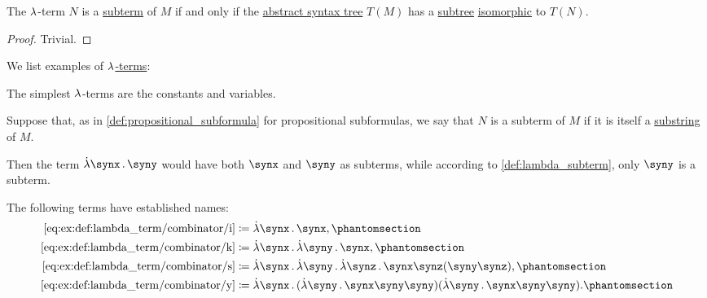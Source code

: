 \begin{proposition}\label{thm:lambda_term_ast_subterm}
  The \( {\mathrm \lambda} \)-term \( N \) is a \hyperref[def:lambda_subterm]{subterm} of \( M \) if and only if the \hyperref[def:lambda_term_ast]{abstract syntax tree} \( T(M) \) has a \hyperref[def:tree/subtree]{subtree} \hyperref[def:labeled_tree/homomorphism]{isomorphic} to \( T(N) \).
\end{proposition}
\begin{proof}
  Trivial.
\end{proof}

\begin{example}\label{ex:def:lambda_term}
  We list examples of \hyperref[def:lambda_term]{\( {\mathrm \lambda} \)-terms}:
  \begin{thmenum}
     The simplest \( {\mathrm \lambda} \)-terms are the constants and variables.

     Suppose that, as in \cref{def:propositional_subformula} for propositional subformulas, we say that \( N \) is a subterm of \( M \) if it is itself a \hyperref[def:formal_language/substring]{substring} of \( M \).

    Then the term \( \qabs \synx \syny \) would have both \( \synx \) and \( \syny \) as subterms, while according to \cref{def:lambda_subterm}, only \( \syny \) is a subterm.

     The following terms have established names:
    \begin{align*}
      \ref{eq:ex:def:lambda_term/combinator/i} &\coloneqq \qabs \synx \synx,                                                           \taglabel[\ensuremath{I}]{eq:ex:def:lambda_term/combinator/i} \\
      \ref{eq:ex:def:lambda_term/combinator/k} &\coloneqq \qabs \synx \qabs \syny \synx,                                               \taglabel[\ensuremath{K}]{eq:ex:def:lambda_term/combinator/k} \\
      \ref{eq:ex:def:lambda_term/combinator/s} &\coloneqq \qabs \synx \qabs \syny \qabs \synz \synx \synz (\syny \synz),               \taglabel[\ensuremath{S}]{eq:ex:def:lambda_term/combinator/s} \\
      \ref{eq:ex:def:lambda_term/combinator/y} &\coloneqq \qabs \synx (\qabs \syny \synx \syny \syny) (\qabs \syny \synx \syny \syny). \taglabel[\ensuremath{Y}]{eq:ex:def:lambda_term/combinator/y}
    \end{align*}


\end{thmenum}
\end{example}
